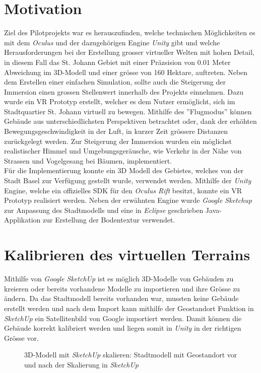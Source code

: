 \section{Motivation}\label{s.vrintro}
Ziel des Pilotprojekts war es herauszufinden, welche technischen Möglichkeiten es mit dem \textit{Oculus} und der dazugehörigen Engine \textit{Unity} gibt und welche Herausforderungen bei der Erstellung grosser virtueller Welten mit hohen Detail, in diesem Fall das St. Johann Gebiet mit einer Präzsision von 0.01 Meter Abweichung im 3D-Modell und einer grösse von 160 Hektare, auftreten. Neben dem Erstellen einer einfachen Simulation, sollte auch die Steigerung der Immersion einen grossen Stellenwert innerhalb des Projekts einnehmen. Dazu wurde ein VR Prototyp erstellt, welcher es dem Nutzer ermöglicht, sich im Stadtquartier St. Johann virtuell zu bewegen. Mithilfe des ''Flugmodus'' können Gebäude aus unterschiedlichsten Perspektiven betrachtet oder, dank der erhöhten Bewegungsgeschwindigkeit in der Luft, in kurzer Zeit grössere Distanzen zurückgelegt werden. Zur Steigerung der Immersion wurden ein möglichst realistischer Himmel und Umgebungsgeräusche, wie Verkehr in der Nähe von Strassen und Vogelgesang bei Bäumen, implementiert.\\[6pt]
Für die Implementierung konnte ein 3D Modell des Gebietes, welches von der Stadt Basel zur Verfügung gestellt wurde, verwendet werden. Mithilfe der \textit{Unity} Engine, welche ein offizielles SDK für den \textit{Oculus Rift} besitzt, konnte ein VR Prototyp realisiert werden. Neben der erwähnten Engine wurde \textit{Google Sketchup} zur Anpassung des Stadtmodells und eine in \textit{Eclipse} geschrieben Java-Applikation zur Erstellung der Bodentextur verwendet.
\newpage
\section{Kalibrieren des virtuellen Terrains}\label{s.terrain}
Mithilfe von \textit{Google SketchUp} ist es möglich 3D-Modelle von Gebäuden zu kreieren oder bereits vorhandene Modelle zu importieren und ihre Grösse zu ändern. Da das Stadtmodell bereits vorhanden war, mussten keine Gebäude erstellt werden und nach dem Import kann mithilfe der Geostandort Funktion in \textit{SketchUp} ein Satellitenbild von Google importiert werden. Damit können die Gebäude korrekt kalibriert werden und liegen somit in \textit{Unity} in der richtigen Grösse vor.

\begin{figure}[htp]%
	\centering	
	\hspace{48pt}%
	\hspace{8pt}%

	\caption[3D-Modell mit \textit{SketchUp} skalieren]
	{3D-Modell mit \textit{SketchUp} skalieren:
		 Stadtmodell mit Geostandort vor und
		 nach der Skalierung in \textit{SketchUp}}%
	\label{fig:sketchup} %
\end{figure}

